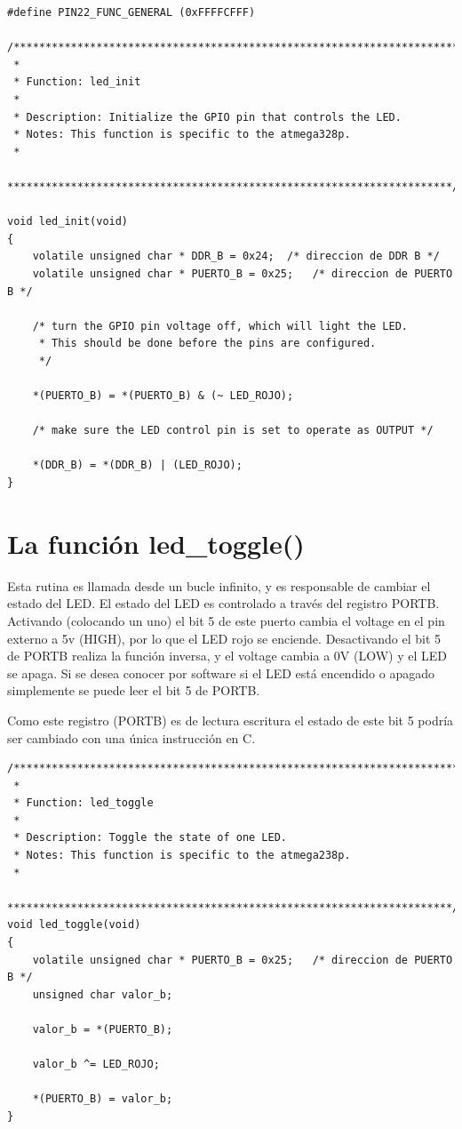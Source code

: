 \documentclass[output=paper, 
colorlinks,
citecolor=brown,
newtxmath
]{langscibook}
\begin{document}
\begin{verbatim}
#define PIN22_FUNC_GENERAL (0xFFFFCFFF)

/**********************************************************************
 *
 * Function: led_init
 *
 * Description: Initialize the GPIO pin that controls the LED.
 * Notes: This function is specific to the atmega328p.
 *
 **********************************************************************/

void led_init(void)
{
    volatile unsigned char * DDR_B = 0x24;	/* direccion de DDR B */
    volatile unsigned char * PUERTO_B = 0x25;	/* direccion de PUERTO B */

    /* turn the GPIO pin voltage off, which will light the LED. 
     * This should be done before the pins are configured. 
     */

    *(PUERTO_B) = *(PUERTO_B) & (~ LED_ROJO);

    /* make sure the LED control pin is set to operate as OUTPUT */

    *(DDR_B) = *(DDR_B) | (LED_ROJO);
}
\end{verbatim}


\section {La función led\_toggle()}

Esta rutina es llamada desde un bucle infinito, y es responsable de cambiar
el estado del LED. El estado del LED es controlado a través del registro
PORTB. Activando (colocando un uno) el bit 5 de este puerto cambia el voltage 
en el pin externo a 5v (HIGH), por lo que el LED rojo se enciende.
Desactivando el bit 5 de PORTB realiza la función inversa, y el voltage cambia
a 0V (LOW) y el LED se apaga.
Si se desea conocer por software si el LED está encendido o apagado simplemente
se puede leer el bit 5 de PORTB.

Como este registro (PORTB) es de lectura escritura el estado de este bit
5 podría ser cambiado con una única instrucción en C.

\begin{verbatim}
/**********************************************************************
 *
 * Function: led_toggle
 *
 * Description: Toggle the state of one LED.
 * Notes: This function is specific to the atmega238p.
 *
 **********************************************************************/
void led_toggle(void)
{
    volatile unsigned char * PUERTO_B = 0x25;	/* direccion de PUERTO B */
    unsigned char valor_b;

    valor_b = *(PUERTO_B);

    valor_b ^= LED_ROJO;

    *(PUERTO_B) = valor_b;
}
\end{verbatim}
\end{document}

